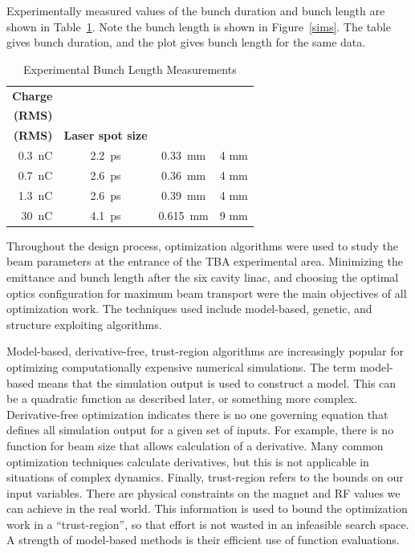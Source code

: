 Experimentally measured values of the bunch duration and bunch length are shown in Table~\ref{exp}.
Note the bunch length is shown in Figure~\ref{sims}. 
The table gives bunch duration, and the plot gives bunch length for the same data.
\begin{table}[h]
	\centering
	\caption{Experimental Bunch Length Measurements}
	\begin{tabular}{rccc}
		\toprule
		\toprule
		\textbf{Charge} & \thead{\textbf{Bunch Dur.}\\ \textbf{(RMS)}} & \thead{\textbf{Bunch Length}\\\textbf{(RMS)}} & \textbf{Laser spot size}  \\
		\midrule
		\SI{0.3}{nC} & \SI{2.2}{ps} &  \SI{0.33}{mm} & 4 mm    \\ %
		\SI{0.7}{nC} & \SI{2.6}{ps} &  \SI{0.36}{mm} & 4 mm   \\ %
		\SI{1.3}{nC} & \SI{2.6}{ps} &  \SI{0.39}{mm} & 4 mm    \\
		\SI{30}{nC}  & \SI{4.1}{ps} &  \SI{0.615}{mm} & 9 mm \\ %
		\bottomrule
	\end{tabular}
	\label{exp}
\end{table}

 \label{sec:opt}

Throughout the design process, optimization algorithms 
were used to study the beam parameters at the entrance of the TBA experimental area.
Minimizing the emittance and bunch length after the six cavity linac,
and choosing the optimal optics configuration for maximum beam transport 
were the main objectives of all optimization work.
The techniques used include model-based, genetic,
and structure exploiting algorithms. 
 
Model-based, derivative-free, trust-region algorithms 
are increasingly popular for optimizing computationally 
expensive numerical simulations. The term model-based means 
that the simulation output is used to construct a model. 
This can be a quadratic function as described later, 
or something more complex.
Derivative-free optimization indicates there is no one 
governing equation that defines all simulation output
for a given set of inputs. For example, there is no 
function for beam size that allows calculation of a derivative. 
Many common optimization techniques calculate derivatives, 
but this is not applicable in situations of complex dynamics.
Finally, trust-region refers to the bounds on our input variables.
There are physical constraints on the magnet and RF values we 
can achieve in the real world. This information is used 
to bound the optimization work in a ``trust-region'', so that
effort is not wasted in an infeasible search space.
A strength of model-based methods is their efficient use of function evaluations. 

